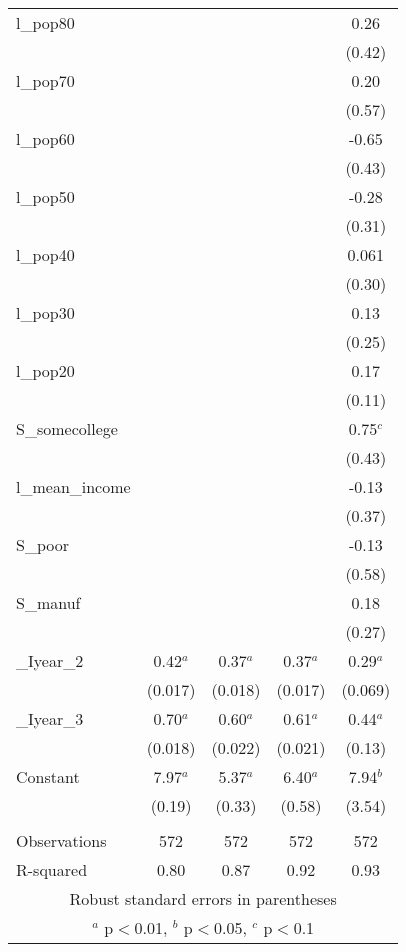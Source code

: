 \documentclass[]{article}
\begin{document}
\begin{tabular}{lcccc}
l\_pop80 &  &  &  & 0.26 \\
 &  &  &  & (0.42) \\
l\_pop70 &  &  &  & 0.20 \\
 &  &  &  & (0.57) \\
l\_pop60 &  &  &  & -0.65 \\
 &  &  &  & (0.43) \\
l\_pop50 &  &  &  & -0.28 \\
 &  &  &  & (0.31) \\
l\_pop40 &  &  &  & 0.061 \\
 &  &  &  & (0.30) \\
l\_pop30 &  &  &  & 0.13 \\
 &  &  &  & (0.25) \\
l\_pop20 &  &  &  & 0.17 \\
 &  &  &  & (0.11) \\
S\_somecollege &  &  &  & 0.75$^c$ \\
 &  &  &  & (0.43) \\
l\_mean\_income &  &  &  & -0.13 \\
 &  &  &  & (0.37) \\
S\_poor &  &  &  & -0.13 \\
 &  &  &  & (0.58) \\
S\_manuf &  &  &  & 0.18 \\
 &  &  &  & (0.27) \\
\_Iyear\_2 & 0.42$^a$ & 0.37$^a$ & 0.37$^a$ & 0.29$^a$ \\
 & (0.017) & (0.018) & (0.017) & (0.069) \\
\_Iyear\_3 & 0.70$^a$ & 0.60$^a$ & 0.61$^a$ & 0.44$^a$ \\
 & (0.018) & (0.022) & (0.021) & (0.13) \\
Constant & 7.97$^a$ & 5.37$^a$ & 6.40$^a$ & 7.94$^b$ \\
 & (0.19) & (0.33) & (0.58) & (3.54) \\
 &  &  &  &  \\
Observations & 572 & 572 & 572 & 572 \\
 R-squared & 0.80 & 0.87 & 0.92 & 0.93 \\ \hline
\multicolumn{5}{c}{ Robust standard errors in parentheses} \\
\multicolumn{5}{c}{ $^a$ p$<$0.01, $^b$ p$<$0.05, $^c$ p$<$0.1} \\
\end{tabular}
\end{document}
